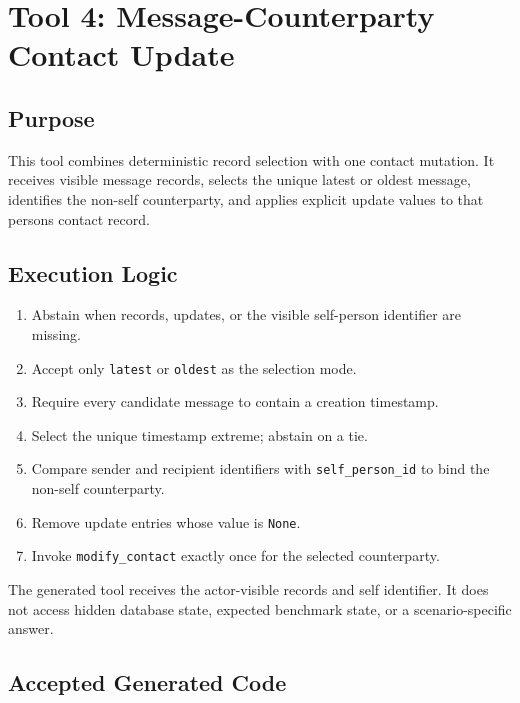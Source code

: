 \section{Tool 4: Message-Counterparty Contact Update}
\label{sec:appendix-message-counterparty-update}

\subsection{Purpose}\label{purpose-3}

This tool combines deterministic record selection with one contact
mutation. It receives visible message records, selects the unique latest
or oldest message, identifies the non-self counterparty, and applies
explicit update values to that person\textquotesingle s contact record.

\subsection{Execution Logic}\label{execution-logic-3}

\begin{enumerate}
\def\labelenumi{\arabic{enumi}.}
\tightlist
\item
  Abstain when records, updates, or the visible self-person identifier
  are missing.
\item
  Accept only \texttt{latest} or \texttt{oldest} as the selection mode.
\item
  Require every candidate message to contain a creation timestamp.
\item
  Select the unique timestamp extreme; abstain on a tie.
\item
  Compare sender and recipient identifiers with
  \texttt{self\_person\_id} to bind the non-self counterparty.
\item
  Remove update entries whose value is \texttt{None}.
\item
  Invoke \texttt{modify\_contact} exactly once for the selected
  counterparty.
\end{enumerate}

The generated tool receives the actor-visible records and self
identifier. It does not access hidden database state, expected benchmark
state, or a scenario-specific answer.

\subsection{Accepted Generated Code}\label{accepted-generated-code-3}

